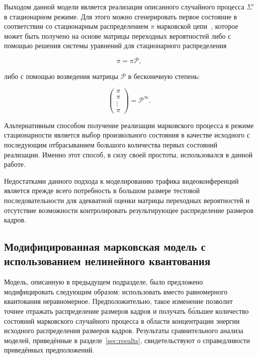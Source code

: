 Выходом данной модели является реализация описанного случайного процесса $\Sigma'$
в стационарном режиме. Для этого можно сгенерировать первое состояние
в соответствии со стационарным распределением $\pi$ марковской цепи~\cite{markovchains},
которое может быть получено на основе матрицы переходных вероятностей
либо с помощью решения системы уравнений для стационарного распределения

\begin{equation}
    \pi = \pi \mathcal{P},
\end{equation}

либо с помощью возведения матрицы $\mathcal{P}$ в бесконечную степень:

\begin{equation}
    \left( \begin{matrix} \pi \\ \pi \\ \vdots \\ \pi \end{matrix} \right) = \mathcal{P}^\infty.
\end{equation}

Альтернативным способом получение реализации марковского процесса
в режиме стационарности является выбор произвольного состояния
в качестве исходного с последующим отбрасыванием большого количества
первых состояний реализации. Именно этот способ, в силу своей простоты,
использовался в данной работе.

Недостатками данного подхода к моделированию трафика видеоконференций
является прежде всего потребность в большом размере тестовой последовательности
для адекватной оценки матрицы переходных вероятностей и отсутствие
возможности контролировать результирующее распределение размеров
кадров.

\subsection{Модифицированная марковская модель с использованием
нелинейного квантования}
\label{sse:markkmeans}

Модель, описанную в предыдущем подразделе, было предложено модифицировать
следующим образом: использовать вместо равномерного квантования
неравномерное. Предположительно, такое изменение позволит точнее
отражать распределение размеров кадров и получать б\'{о}льшее количество
состояний марковского случайного процесса в области концентрации
энергии исходного распределения размеров кадров. Результаты
сравнительного анализа моделей, приведённые в разделе~\ref{sec:results},
свидетельствуют о справедливости приведённых предположений.

